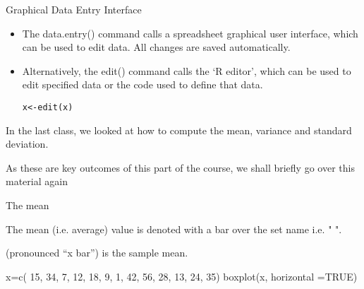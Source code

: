 
\begin{slide}{Graphical Data Entry Interface}
\begin{itemize}

\item The data.entry() command calls a spreadsheet graphical user
interface, which can be used to edit data. All changes are saved
automatically.




\item Alternatively, the edit() command calls the `R editor',
which can be used to edit specified data or the code used to
define that data.

\begin{verbatim}
x<-edit(x)
\end{verbatim}

\end{itemize}
\end{slide}


In the last class, we looked at how to compute the mean, variance and standard deviation. 
 
As these are key outcomes of this part of the course, we shall briefly go over this material again 

 

The mean
 
The mean (i.e. average) value is denoted with a bar over the set name i.e. " ".



     (pronounced “x bar”)  is the sample mean.




x=c( 15,  34,  7,  12,  18,  9, 1,  42,  56,  28,  13,  24, 35)
boxplot(x, horizontal =TRUE)
